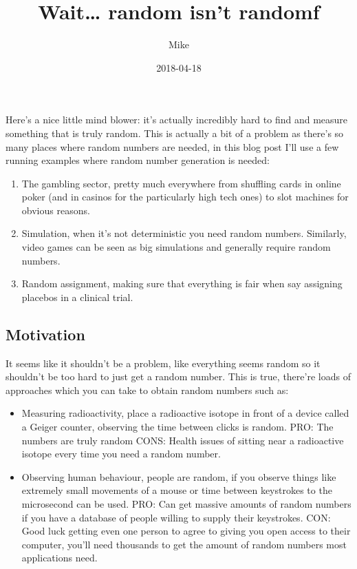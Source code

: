 \documentclass[]{article}
\title{Wait\ldots{} random isn't randomf}
\author{Mike}
\date{2018-04-18}
\providecommand{\tightlist}{%
  \setlength{\itemsep}{0pt}\setlength{\parskip}{0pt}}
\begin{document}
\maketitle

Here's a nice little mind blower: it's actually incredibly hard to find
and measure something that is truly random. This is actually a bit of a
problem as there's so many places where random numbers are needed, in
this blog post I'll use a few running examples where random number
generation is needed:

\begin{enumerate}
\def\labelenumi{\arabic{enumi}.}
\tightlist
\item
  The gambling sector, pretty much everywhere from shuffling cards in
  online poker (and in casinos for the particularly high tech ones) to
  slot machines for obvious reasons.
\item
  Simulation, when it's not deterministic you need random numbers.
  Similarly, video games can be seen as big simulations and generally
  require random numbers.
\item
  Random assignment, making sure that everything is fair when say
  assigning placebos in a clinical trial.
\end{enumerate}

\subsection{Motivation}\label{motivation}

It seems like it shouldn't be a problem, like everything seems random so
it shouldn't be too hard to just get a random number. This is true,
there're loads of approaches which you can take to obtain random numbers
such as:

\begin{itemize}
\tightlist
\item
  Measuring radioactivity, place a radioactive isotope in front of a
  device called a Geiger counter, observing the time between clicks is
  random. PRO: The numbers are truly random CONS: Health issues of
  sitting near a radioactive isotope every time you need a random
  number.
\item
  Observing human behaviour, people are random, if you observe things
  like extremely small movements of a mouse or time between keystrokes
  to the microsecond can be used. PRO: Can get massive amounts of random
  numbers if you have a database of people willing to supply their
  keystrokes. CON: Good luck getting even one person to agree to giving
  you open access to their computer, you'll need thousands to get the
  amount of random numbers most applications need.
\end{itemize}
\end{document}
